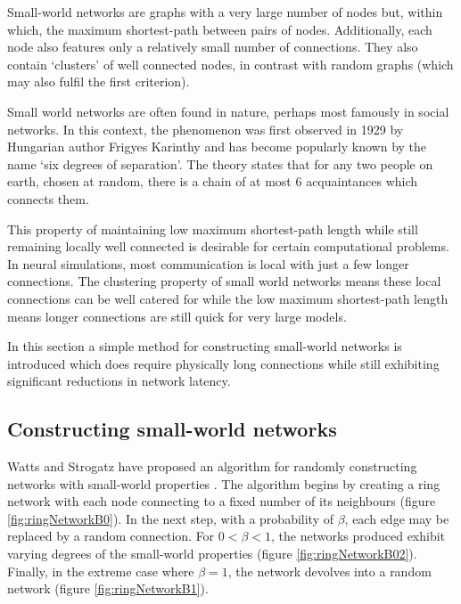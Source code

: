 		Small-world networks are graphs with a very large number of nodes but,
		within which, the maximum shortest-path between pairs of nodes.
		Additionally, each node also features only a relatively small number of
		connections. They also contain `clusters' of well connected nodes, in
		contrast with random graphs (which may also fulfil the first criterion).
		
		Small world networks are often found in nature, perhaps most famously in
		social networks. In this context, the phenomenon was first observed in 1929
		by Hungarian author Frigyes Karinthy\cite{karinthy29} and has become
		popularly known by the name `six degrees of separation'. The theory states
		that for any two people on earth, chosen at random, there is a chain of at
		most 6 acquaintances which connects them.
		
		This property of maintaining low maximum shortest-path length while still
		remaining locally well connected is desirable for certain computational
		problems. In neural simulations, most communication is local with just a few
		longer connections. The clustering property of small world networks means
		these local connections can be well catered for while the low maximum
		shortest-path length means longer connections are still quick for very large
		models.
		
		In this section a simple method for constructing small-world networks is
		introduced which does require physically long connections while still
		exhibiting significant reductions in network latency.
		
		\subsection{Constructing small-world networks}
			
			
			Watts and Strogatz have proposed an algorithm for randomly constructing
			networks with small-world properties \cite{watts98}. The algorithm begins
			by creating a ring network with each node connecting to a fixed number of
			its neighbours (figure \ref{fig:ringNetworkB0}). In the next step, with a
			probability of $\beta$, each edge may be replaced by a random connection.
			For $0 < \beta < 1$, the networks produced exhibit varying degrees of the
			small-world properties (figure \ref{fig:ringNetworkB02}).  Finally, in the
			extreme case where $\beta=1$, the network devolves into a random network
			(figure \ref{fig:ringNetworkB1}).
			
